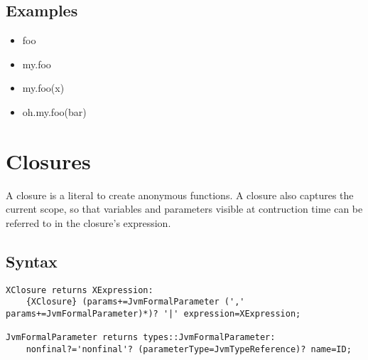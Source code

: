 \documentclass[a4paper,10pt]{scrreprt}
\newlength{\itemindentlen}
\begin{document}
\subsection{Examples}

\setlength{\itemindentlen}{\textwidth}
\begin{itemize}
\addtolength{\itemindentlen}{-2em}

\item \begin{minipage}[t]{\itemindentlen}
foo
\end{minipage}

\item \begin{minipage}[t]{\itemindentlen}
my.foo
\end{minipage}

\item \begin{minipage}[t]{\itemindentlen}
my.foo(x)
\end{minipage}

\item \begin{minipage}[t]{\itemindentlen}
oh.my.foo(bar)
\end{minipage}

\end{itemize}
\addtolength{\itemindentlen}{2em}







\section{Closures\label{Closures}}
A closure is a literal to create anonymous functions. A closure also captures the current scope, so that variables and parameters visible at contruction time can be referred to in the
closure's expression. 

\subsection{Syntax}
\begin{lstlisting}
XClosure returns XExpression:
	{XClosure} (params+=JvmFormalParameter (',' params+=JvmFormalParameter)*)? '|' expression=XExpression;
	
JvmFormalParameter returns types::JvmFormalParameter:
	nonfinal?='nonfinal'? (parameterType=JvmTypeReference)? name=ID;

\end{lstlisting}
\end{document}
